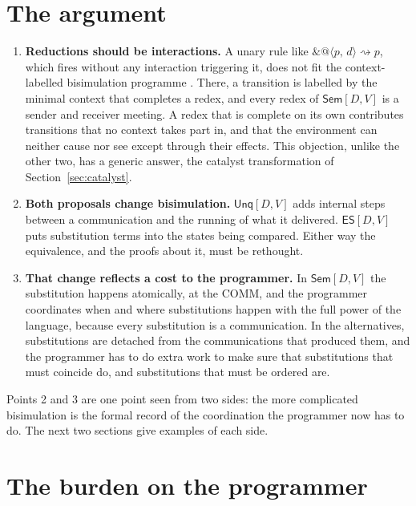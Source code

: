 \documentclass[11pt,a4paper]{article}
\makeatletter
\theoremstyle{plain}
\theoremstyle{definition}
\theoremstyle{remark}
\newcommand{\qn}[2]{@\langle #1,\,#2\rangle}
\newcommand{\unq}[1]{\mathop{\&}#1}
\newcommand{\red}{\rightsquigarrow}
\newcommand{\Sem}{\textsf{Sem}[D,V]}
\newcommand{\Unq}{\textsf{Unq}[D,V]}
\newcommand{\ES}{\textsf{ES}[D,V]}
\makeatother
\begin{document}
\section{The argument}\label{sec:argument}

\begin{enumerate}[leftmargin=1.5em]
\item \textbf{Reductions should be interactions.} A unary rule like
  $\unq{\qn{p}{d}}\red p$, which fires without any interaction triggering it,
  does not fit the context-labelled bisimulation programme \cite{LM00}. There,
  a transition is labelled by the minimal context that completes a redex, and
  every redex of $\Sem$ is a sender and receiver meeting. A redex that is
  complete on its own contributes transitions that no context takes part in,
  and that the environment can neither cause nor see except through their
  effects. This objection, unlike the other two, has a generic answer, the
  catalyst transformation of Section~\ref{sec:catalyst}.
\item \textbf{Both proposals change bisimulation.} $\Unq$ adds internal steps
  between a communication and the running of what it delivered. $\ES$ puts
  substitution terms into the states being compared. Either way the
  equivalence, and the proofs about it, must be rethought.
\item \textbf{That change reflects a cost to the programmer.} In $\Sem$ the
  substitution happens atomically, at the COMM, and the programmer
  coordinates when and where substitutions happen with the full power of the
  language, because every substitution is a communication. In the
  alternatives, substitutions are detached from the communications that
  produced them, and the programmer has to do extra work to make sure that
  substitutions that must coincide do, and substitutions that must be ordered
  are.
\end{enumerate}

Points 2 and 3 are one point seen from two sides: the more complicated
bisimulation is the formal record of the coordination the programmer now has
to do. The next two sections give examples of each side.

\section{The burden on the programmer}\label{sec:programmer}
\end{document}
